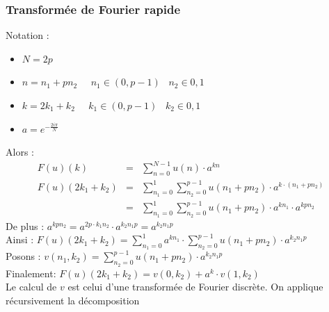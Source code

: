 \documentclass[french]{beamer}
\begin{document}
\begin{frame}[allowframebreaks]
	\frametitle{Transformée de Fourier rapide}
	Notation :
	\begin{itemize}
		\item $N = 2p$
		\item $n = n_1 + pn_2 \;\;\;\;\; n_1 \in (0, p-1) \;\;\; n_2 \in {0, 1}$
		\item $k = 2k_1 + k_2 \;\;\;\;\; k_1 \in (0, p-1) \;\;\; k_2 \in {0, 1}$
		\item $a = e^{-\frac{2i\pi}{N}}$
	\end{itemize}
	Alors :
	\begin{eqnarray}
		F(u)(k) & = & \sum\limits_{n = 0}^{N-1} u(n) \cdot a^{kn} \\
		F(u)(2k_1 + k_2) & = & \sum\limits_{n_1 = 0}^{1} \sum\limits_{n_2 = 0}^{p-1} u(n_1 + pn_2) \cdot a^{k \cdot (n_1 + pn_2)} \\
		& = & \sum\limits_{n_1 = 0}^{1} \sum\limits_{n_2 = 0}^{p-1} u(n_1 + pn_2) \cdot a^{kn_1} \cdot a^{kpn_2}
	\end{eqnarray}
	De plus :
	$a^{kpn_2} = a^{2p \cdot k_1n_2} \cdot a^{k_2n_1p} = a^{k_2n_1p}$ \\
	Ainsi :
	$F(u)(2k_1 + k_2) = \sum\limits_{n_1 = 0}^{1} a^{kn_1} \cdot \sum\limits_{n_2 = 0}^{p-1} u(n_1 + pn_2) \cdot a^{k_2n_1p}$ \\
	Posons :
	$ v(n_1, k_2) = \sum\limits_{n_2 = 0}^{p-1} u(n_1 + pn_2) \cdot a^{k_2n_1p}$ \\
	Finalement: 
	$F(u)(2k_1 + k_2) = v(0, k_2) + a^{k} \cdot v(1, k_2)$\\
	Le calcul de $v$ est celui d'une transformée de Fourier discrète. On applique récursivement la décomposition
	\bigskip
\end{frame}
\end{document}
